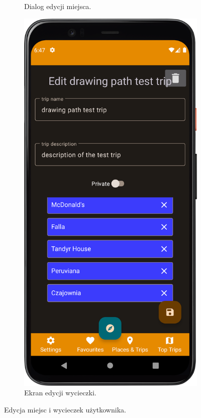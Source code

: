 \begin{figure}[H]
\begin{subfigure}[b]{0.3\textwidth}
                \caption{Dialog edycji miejsca.\label{edit_place}}
            \end{subfigure}
            \hfill
            \begin{subfigure}[b]{0.3\textwidth}
                \centering
                \includegraphics[width=\textwidth]{src/app/edit_trip.png}
                \caption{Ekran edycji wycieczki.\label{edit_trip}}
            \end{subfigure}
            \caption{Edycja miejsc i wycieczek użytkownika.\label{edit}}
            \qquad
        \end{figure} 
        \vspace{1cm}

